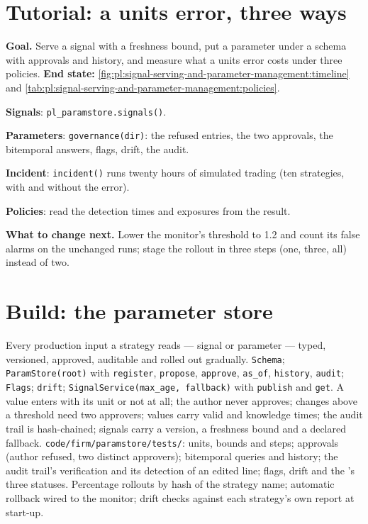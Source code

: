 \section{Tutorial: a units error, three ways}\label{tut:pl:signal-serving-and-parameter-management:tut}

\begin{tutorial}
\textbf{Goal.} Serve a signal with a freshness bound, put a parameter under a schema with approvals and history, and measure what a units error
costs under three policies. \textbf{End state:} \cref{fig:pl:signal-serving-and-parameter-management:timeline} and
\cref{tab:pl:signal-serving-and-parameter-management:policies}.
\begin{tutsteps}
\item \textbf{Signals}: \texttt{pl\_paramstore.signals()}.
\item \textbf{Parameters}: \texttt{governance(dir)}: the refused entries, the two approvals, the bitemporal answers, flags, drift, the audit.
\item \textbf{Incident}: \texttt{incident()} runs twenty hours of simulated trading (ten strategies, with and without the error).
\item \textbf{Policies}: read the detection times and exposures from the result.
\end{tutsteps}
\textbf{What to change next.} Lower the monitor's threshold to 1.2 and count its false alarms on the unchanged runs; stage the rollout in three
steps (one, three, all) instead of two.
\end{tutorial}

\section{Build: the parameter store}\label{bld:pl:signal-serving-and-parameter-management:paramstore}

\begin{build}
 Every production input a strategy reads --- signal or parameter --- typed, versioned, approved, auditable and rolled out
gradually.
 \texttt{Schema}; \texttt{ParamStore(root)} with \texttt{register}, \texttt{propose}, \texttt{approve}, \texttt{as\_of},
\texttt{history}, \texttt{audit}; \texttt{Flags}; \texttt{drift}; \texttt{SignalService(max\_age, fallback)} with \texttt{publish} and
\texttt{get}.
 A value enters with its unit or not at all; the author never approves; changes above a threshold need two approvers; values
carry valid and knowledge times; the audit trail is hash-chained; signals carry a version, a freshness bound and a declared fallback.
 \texttt{code/firm/paramstore/tests/}: units, bounds and steps; approvals (author refused, two distinct approvers);
bitemporal queries and history; the audit trail's verification and its detection of an edited line; flags, drift and the 's
three statuses.
 Percentage rollouts by hash of the strategy name; automatic rollback wired to the monitor; drift checks against each strategy's
own report at start-up.
\end{build}

